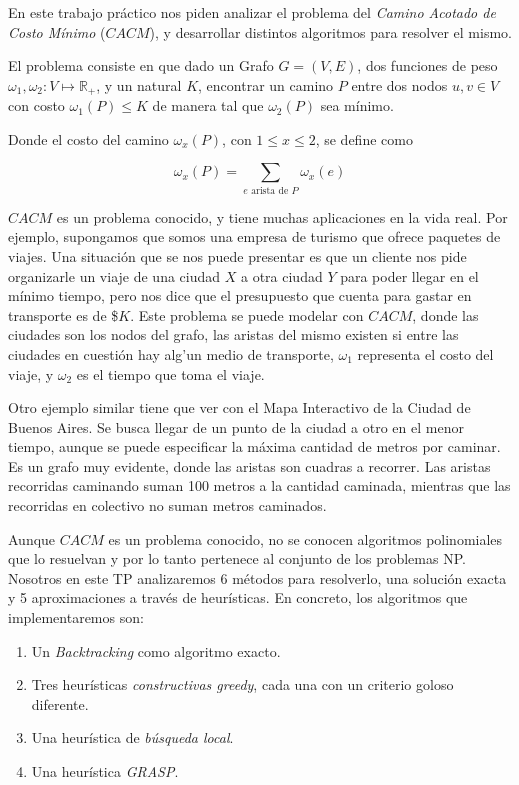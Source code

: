 
En este trabajo pr\'actico nos piden analizar el problema del \textit{Camino Acotado de Costo M\'inimo} ($CACM$), y desarrollar distintos algoritmos para resolver el mismo. 

El problema consiste en que dado un Grafo $G = (V,E)$, dos funciones de peso $\omega_1, \omega_2: V \mapsto \mathbb{R}_+$, y un natural $K$, encontrar un camino $P$ entre dos nodos $u, v \in V$ con costo $\omega_1(P) \leq K$ de manera tal que $\omega_2(P)$ sea m\'inimo. 

Donde el costo del camino $\omega_x(P)$, con $1 \leq x \leq 2$, se define como

\begin{equation*}
 \omega_x(P) = \sum_{e \text{ arista de } P} \omega_x(e)
\end{equation*}

$CACM$ es un problema conocido, y tiene muchas aplicaciones en la vida real. Por ejemplo, supongamos que somos una empresa de turismo que ofrece paquetes de viajes. Una situaci\'on que se nos puede presentar es que un cliente nos pide organizarle un viaje de una ciudad $X$ a otra ciudad $Y$ para poder llegar en el m\'inimo tiempo, pero nos dice que el presupuesto que cuenta para gastar en transporte es de \$$K$. Este problema se puede modelar con $CACM$, donde las ciudades son los nodos del grafo, las aristas del mismo existen si entre las ciudades en cuesti\'on hay alg'un medio de transporte, $\omega_1$ representa el costo del viaje, y $\omega_2$ es el tiempo que toma el viaje. 

Otro ejemplo similar tiene que ver con el Mapa Interactivo de la Ciudad de Buenos Aires. Se busca llegar de un punto de la ciudad a otro en el
menor tiempo, aunque se puede especificar la máxima cantidad de metros por caminar. Es un grafo muy evidente, donde las aristas son cuadras a
recorrer. Las aristas recorridas caminando suman 100 metros a la cantidad caminada, mientras que las recorridas en colectivo no suman metros
caminados.

Aunque $CACM$ es un problema conocido, no se conocen algoritmos polinomiales que lo resuelvan y por lo tanto pertenece al conjunto de los problemas NP. Nosotros en este TP analizaremos 6 m\'etodos para resolverlo, una soluci\'on exacta y 5 aproximaciones a trav\'es de heur\'isticas. En concreto, los algoritmos que implementaremos son: 

\begin{enumerate}
\item Un \textit{Backtracking} como algoritmo exacto.
\item Tres heur\'isticas \textit{constructivas greedy}, cada una con un criterio goloso diferente. 
\item Una heur\'istica de \textit{b\'usqueda local}.
\item Una heur\'istica \textit{GRASP}.
\end{enumerate}

